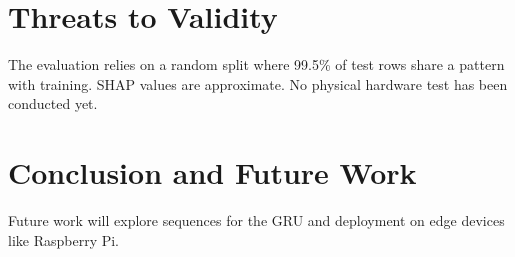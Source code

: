 \documentclass[conference]{IEEEtran}
\begin{document}
\section{Threats to Validity}
The evaluation relies on a random split where 99.5\% of test rows share a pattern with training. SHAP values are approximate. No physical hardware test has been conducted yet.

\section{Conclusion and Future Work}
Future work will explore sequences for the GRU and deployment on edge devices like Raspberry Pi.



\end{document}

